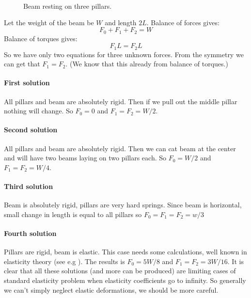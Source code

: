 \begin{figure}[htbp]
    \centering
    \caption{Beam resting on three pillars.}
    \label{beam3}
\end{figure}

Let the weight of the beam be $W$ and length $2 L$.
Balance of forces gives:
\begin{equation}
        F_0+F_1+F_2=W \label {bf}
\end{equation}
Balance of torques gives:
\begin{equation}
        F_1 L=F_2 L \label {bt}
\end{equation}
   So we have only two equations for three
unknown forces. From the symmetry we can get that $F_1=F_2$. 
(We know that this already from balance of torques.)
\paragraph{ First solution}
All pillars and beam are absolutely rigid. Then
if we pull out the middle pillar nothing will change.
So $F_0=0$ and $F_1=F_2=W/2$.
\paragraph{ Second solution}
All pillars and beam are absolutely rigid. Then
we can cat beam at the center and will have two
beams laying on two pillars each.
So $F_0=W/2$ and $F_1=F_2=W/4$.
\paragraph{ Third solution}
Beam is absolutely rigid, pillars are very hard springs.
Since beam is horizontal, small change in length is 
equal to all pillars so $F_0=F_1=F_2=w/3$
\paragraph{ Fourth solution}
Pillars are rigid, beam is elastic. This case needs
some calculations, well known in elasticity theory
(see e.g \cite {LandauLifshitz-7}).
The results is $F_0=5 W/8$ and $F_1=F_2=3 W/16$.
It is clear that all these solutions (and more can be
produced) are limiting cases of standard elasticity 
problem when elasticity coefficients go to infinity.
So generally we can't simply neglect elastic deformations,
we should be more careful.

